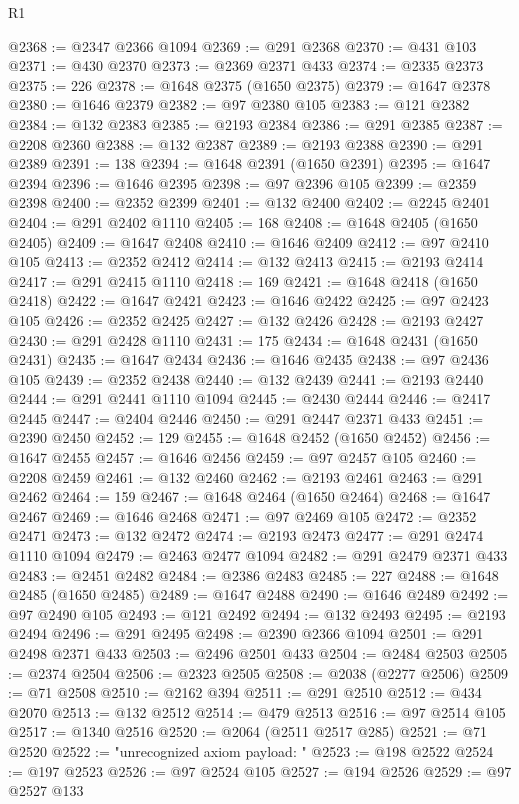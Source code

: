 \begin{lexlean}{R1}
\begin{coremodule}
{{{{{{{{{{{{{{{{{{{{{{{{{{{{{{{{{{{{{{{{{{{{{{{{{{{{{{{{{{{{{{{{{{{{{{{{{{{{{{{{{{{{{{{{{{{{{{{{{{{{{{{{{{{{{{{{{{{{{{{{{{{{{{{{{{{{{{{{{{{{{{{{{{{{{{{{{{{{{{{{{{{{{{{{{{{{{{{{{{{{{{{{{{@2368 := @2347 @2366 @1094
@2369 := @291 @2368
@2370 := @431 @103
@2371 := @430 @2370
@2373 := @2369 @2371 @433
@2374 := @2335 @2373
@2375 := 226
@2378 := @1648 @2375 (@1650 @2375)
@2379 := @1647 @2378
@2380 := @1646 @2379
@2382 := @97 @2380 @105
@2383 := @121 @2382
@2384 := @132 @2383
@2385 := @2193 @2384
@2386 := @291 @2385
@2387 := @2208 @2360
@2388 := @132 @2387
@2389 := @2193 @2388
@2390 := @291 @2389
@2391 := 138
@2394 := @1648 @2391 (@1650 @2391)
@2395 := @1647 @2394
@2396 := @1646 @2395
@2398 := @97 @2396 @105
@2399 := @2359 @2398
@2400 := @2352 @2399
@2401 := @132 @2400
@2402 := @2245 @2401
@2404 := @291 @2402 @1110
@2405 := 168
@2408 := @1648 @2405 (@1650 @2405)
@2409 := @1647 @2408
@2410 := @1646 @2409
@2412 := @97 @2410 @105
@2413 := @2352 @2412
@2414 := @132 @2413
@2415 := @2193 @2414
@2417 := @291 @2415 @1110
@2418 := 169
@2421 := @1648 @2418 (@1650 @2418)
@2422 := @1647 @2421
@2423 := @1646 @2422
@2425 := @97 @2423 @105
@2426 := @2352 @2425
@2427 := @132 @2426
@2428 := @2193 @2427
@2430 := @291 @2428 @1110
@2431 := 175
@2434 := @1648 @2431 (@1650 @2431)
@2435 := @1647 @2434
@2436 := @1646 @2435
@2438 := @97 @2436 @105
@2439 := @2352 @2438
@2440 := @132 @2439
@2441 := @2193 @2440
@2444 := @291 @2441 @1110 @1094
@2445 := @2430 @2444
@2446 := @2417 @2445
@2447 := @2404 @2446
@2450 := @291 @2447 @2371 @433
@2451 := @2390 @2450
@2452 := 129
@2455 := @1648 @2452 (@1650 @2452)
@2456 := @1647 @2455
@2457 := @1646 @2456
@2459 := @97 @2457 @105
@2460 := @2208 @2459
@2461 := @132 @2460
@2462 := @2193 @2461
@2463 := @291 @2462
@2464 := 159
@2467 := @1648 @2464 (@1650 @2464)
@2468 := @1647 @2467
@2469 := @1646 @2468
@2471 := @97 @2469 @105
@2472 := @2352 @2471
@2473 := @132 @2472
@2474 := @2193 @2473
@2477 := @291 @2474 @1110 @1094
@2479 := @2463 @2477 @1094
@2482 := @291 @2479 @2371 @433
@2483 := @2451 @2482
@2484 := @2386 @2483
@2485 := 227
@2488 := @1648 @2485 (@1650 @2485)
@2489 := @1647 @2488
@2490 := @1646 @2489
@2492 := @97 @2490 @105
@2493 := @121 @2492
@2494 := @132 @2493
@2495 := @2193 @2494
@2496 := @291 @2495
@2498 := @2390 @2366 @1094
@2501 := @291 @2498 @2371 @433
@2503 := @2496 @2501 @433
@2504 := @2484 @2503
@2505 := @2374 @2504
@2506 := @2323 @2505
@2508 := @2038 (@2277 @2506)
@2509 := @71 @2508
@2510 := @2162 @394
@2511 := @291 @2510
@2512 := @434 @2070
@2513 := @132 @2512
@2514 := @479 @2513
@2516 := @97 @2514 @105
@2517 := @1340 @2516
@2520 := @2064 (@2511 @2517 @285)
@2521 := @71 @2520
@2522 := "unrecognized axiom payload: "
@2523 := @198 @2522
@2524 := @197 @2523
@2526 := @97 @2524 @105
@2527 := @194 @2526
@2529 := @97 @2527 @133
}}}}}}}}}}}}}}}}}}}}}}}}}}}}}}}}}}}}}}}}}}}}}}}}}}}}}}}}}}}}}}}}}}}}}}}}}}}}}}}}}}}}}}}}}}}}}}}}}}}}}}}}}}}}}}}}}}}}}}}}}}}}}}}}}}}}}}}}}}}}}}}}}}}}}}}}}}}}}}}}}}}}}}}}}}}}}}}}}}}}}}}}}}
\end{coremodule}
\end{lexlean}
